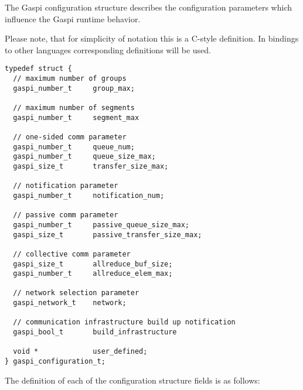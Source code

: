 \documentclass[a4paper]{article}
\makeatletter
\newlength{\st}\setlength{\st}{0pt}
\newcommand{\GASPI}{{\sc Gaspi}}
\newcounter{counttodo}
\newlength{\savetabcolsep}
\newlength{\savearrayrulewidth}
\newenvironment{todo}
{\stepcounter{counttodo}
 \typeout{Environment TODO call \thecounttodo}
 \setlength{\savetabcolsep}{\tabcolsep}
 \setlength{\savearrayrulewidth}{\arrayrulewidth}
 \renewcommand{\tabcolsep}{0pt}
 \renewcommand{\arrayrulewidth}{2pt}
 \begin{center}
 \begin{tabular}{c|l@{\hspace*{2em}}|@{\hspace*{2em}}c}
 &
 \begin{minipage}{0.66\textwidth}
 \begin{itemize}
}
{\end{itemize}
 \end{minipage}
 &  todo \#\thecounttodo
 \end{tabular} \marginpar{$\Longleftarrow$}
 \end{center}
 \renewcommand{\tabcolsep}{\savetabcolsep}
 \renewcommand{\arrayrulewidth}{\savearrayrulewidth}
}
\makeatother
\begin{document}
The \GASPI{} configuration structure describes the configuration parameters which
influence the \GASPI{} runtime behavior.

Please note, that for simplicity of notation this is a C-style
definition. In bindings to other languages corresponding definitions
will be used.


\begin{lstlisting}
typedef struct {
  // maximum number of groups
  gaspi_number_t     group_max;

  // maximum number of segments
  gaspi_number_t     segment_max

  // one-sided comm parameter
  gaspi_number_t     queue_num;
  gaspi_number_t     queue_size_max;
  gaspi_size_t       transfer_size_max;

  // notification parameter
  gaspi_number_t     notification_num;

  // passive comm parameter
  gaspi_number_t     passive_queue_size_max;
  gaspi_size_t       passive_transfer_size_max;

  // collective comm parameter
  gaspi_size_t       allreduce_buf_size;
  gaspi_number_t     allreduce_elem_max;

  // network selection parameter
  gaspi_network_t    network;

  // communication infrastructure build up notification
  gaspi_bool_t       build_infrastructure

  void *             user_defined;
} gaspi_configuration_t;
\end{lstlisting}

The definition of each of the configuration structure fields is as follows:
\end{document}
